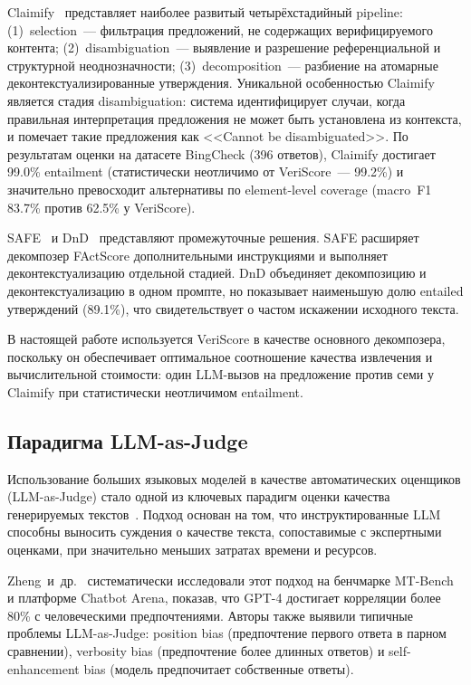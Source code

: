 \documentclass[a4paper,14pt]{extarticle}
\begin{document}
Claimify~\cite{metropolitansky2025claimify} представляет наиболее развитый четырёхстадийный pipeline: (1)~selection~--- фильтрация предложений, не содержащих верифицируемого контента; (2)~disambiguation~--- выявление и разрешение референциальной и структурной неоднозначности; (3)~decomposition~--- разбиение на атомарные деконтекстуализированные утверждения. Уникальной особенностью Claimify является стадия disambiguation: система идентифицирует случаи, когда правильная интерпретация предложения не может быть установлена из контекста, и помечает такие предложения как <<Cannot be disambiguated>>. По результатам оценки на датасете BingCheck (396 ответов), Claimify достигает 99.0\% entailment (статистически неотличимо от VeriScore~--- 99.2\%) и значительно превосходит альтернативы по element-level coverage (macro~F1 83.7\% против 62.5\% у VeriScore).

SAFE~\cite{wei2024safe} и DnD~\cite{wanner2024dnd} представляют промежуточные решения. SAFE расширяет декомпозер FActScore дополнительными инструкциями и выполняет деконтекстуализацию отдельной стадией. DnD объединяет декомпозицию и деконтекстуализацию в одном промпте, но показывает наименьшую долю entailed утверждений (89.1\%), что свидетельствует о частом искажении исходного текста.

В настоящей работе используется VeriScore в качестве основного декомпозера, поскольку он обеспечивает оптимальное соотношение качества извлечения и вычислительной стоимости: один LLM-вызов на предложение против семи у Claimify при статистически неотличимом entailment.


\subsection{Парадигма LLM-as-Judge}

Использование больших языковых моделей в качестве автоматических оценщиков (LLM-as-Judge) стало одной из ключевых парадигм оценки качества генерируемых текстов~\cite{zheng2024llm_judge}. Подход основан на том, что инструктированные LLM способны выносить суждения о качестве текста, сопоставимые с экспертными оценками, при значительно меньших затратах времени и ресурсов.

Zheng~и~др.~\cite{zheng2024llm_judge} систематически исследовали этот подход на бенчмарке MT-Bench и платформе Chatbot Arena, показав, что GPT-4 достигает корреляции более 80\% с человеческими предпочтениями. Авторы также выявили типичные проблемы LLM-as-Judge: position bias (предпочтение первого ответа в парном сравнении), verbosity bias (предпочтение более длинных ответов) и self-enhancement bias (модель предпочитает собственные ответы).
\end{document}
